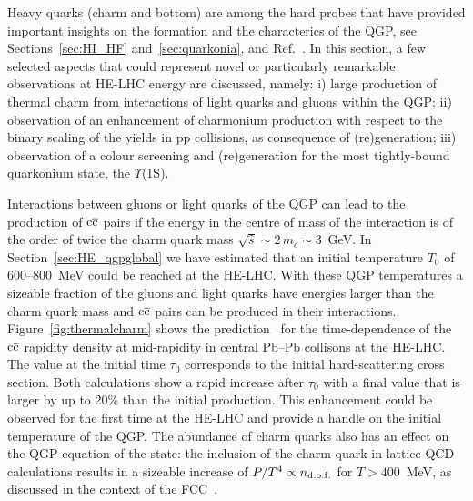 \documentclass[../report.tex]{subfiles}
\begin{document}
Heavy quarks (charm and bottom) are among the hard probes that have
provided important insights on the formation and the characterics of
the QGP, see Sections~\ref{sec:HI_HF} and~\ref{sec:quarkonia}, and Ref.~\cite{Andronic:2015wma}.
In this section,
a few selected aspects that could
represent novel or particularly remarkable observations at HE-LHC
energy are discussed,
namely: i) large production of thermal charm from
  interactions of light quarks and gluons within the QGP;
ii) observation of an enhancement of charmonium production with
  respect to the binary scaling of the yields in pp collisions, as
  consequence of (re)generation;
iii) observation of a colour screening and (re)generation for the most tightly-bound
  quarkonium state, the $\Upsilon$(1S).

Interactions between gluons or light quarks of the QGP can lead to the
production of $\rm c\overline c$ pairs if the energy in the centre of mass 
of the interaction is of the order of twice the charm quark mass
$\sqrt{\hat s}\sim 2\,m_c\sim 3$~GeV. 
In Section~\ref{sec:HE_qgpglobal} we have estimated 
that an initial temperature $T_0$ of 600--800~MeV could be
reached at the HE-LHC. 
With these QGP temperatures a sizeable fraction of the gluons and
light quarks have energies larger than the charm quark mass 
and $\rm c\overline c$ pairs can be produced in their interactions. 
Figure~\ref{fig:thermalcharm} shows the prediction~\cite{Liu:2016zle} for the time-dependence of the $\rm c\overline c$
rapidity density at mid-rapidity in central Pb--Pb collisons at the HE-LHC. The value at the initial time
$\tau_0$ corresponds to the initial hard-scattering cross section.
Both calculations show a rapid increase
after $\tau_0$ with a final value that is larger by up to 20\% than
the initial production. 
This enhancement could be observed for the first time at the HE-LHC
and provide a handle on the initial
temperature of the QGP. 
The abundance of charm quarks also has an effect on the QGP equation
of the state: 
the inclusion of the charm quark in lattice-QCD calculations results in a sizeable 
increase of $P/T^4 \propto n_{\rm d.o.f.}$ for $T>400$~MeV, as
discussed in the context of the FCC~\cite{Dainese:2016gch}.  
\end{document}
